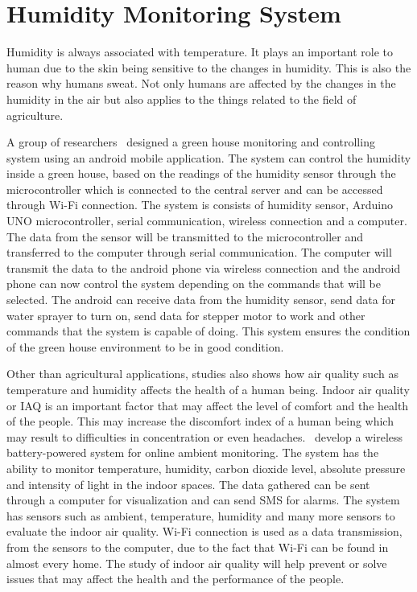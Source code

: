 \section{Humidity Monitoring System}
Humidity is always associated with temperature. It plays an important role to human due to the skin being sensitive to the changes in humidity. This is also the reason why humans sweat. Not only humans are affected by the changes in the humidity in the air but also applies to the things related to the field of agriculture. 

A group of researchers~\cite{Aji} designed a green house monitoring and controlling system using an android mobile application. The system can control the humidity inside a green house, based on the readings of the humidity sensor through the microcontroller which is connected to the central server and can be accessed through Wi-Fi connection. The system is consists of humidity sensor, Arduino UNO microcontroller, serial communication, wireless connection and a computer. The data from the sensor will be transmitted to the microcontroller and transferred to the computer through serial communication. The computer will transmit the data to the android phone via wireless connection and the android phone can now control the system depending on the commands that will be selected. The android can receive data from the humidity sensor, send data for water sprayer to turn on, send data for stepper motor to work and other commands that the system is capable of doing. This system ensures the condition of the green house environment to be in good condition.

Other than agricultural applications, studies also shows how air quality such as temperature and humidity affects the health of a human being. Indoor air quality or IAQ is an important factor that may affect the level of comfort and the health of the people. This may increase the discomfort index of a human being which may result to difficulties in concentration or even headaches.~\cite{Folea} develop a wireless battery-powered system for online ambient monitoring. The system has the ability to monitor temperature, humidity, carbon dioxide level, absolute pressure and intensity of light in the indoor spaces. The data gathered can be sent through a computer for visualization and can send SMS for alarms. The system has sensors such as ambient, temperature, humidity and many more sensors to evaluate the indoor air quality. Wi-Fi connection is used as a data transmission, from the sensors to the computer, due to the fact that Wi-Fi can be found in almost every home. The study of indoor air quality will help prevent or solve issues that may affect the health and the performance of the people.

